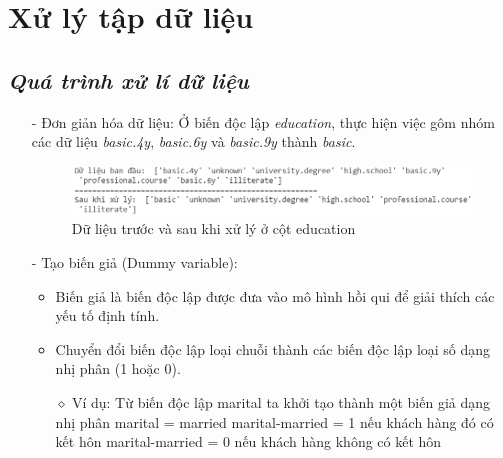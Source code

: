 \documentclass{report}
\newcommand\tab[1][1.25cm]{\hspace*{#1}}
\begin{document}
\section{Xử lý tập dữ liệu}
 \subsection{ \textit{Quá trình xử lí dữ liệu}}
        \fontsize{13}{14}\selectfont
        \begin{enumerate}
                    \item [- ] Đơn giản hóa dữ liệu: Ở biến độc lập \textit{education}, thực hiện việc gôm nhóm các dữ liệu \textit{basic.4y}, \textit{basic.6y} và \textit{basic.9y} thành \textit{basic}.
                     \begin{center}
        \begin{figure}[htp]
    	\begin{center}
    		\includegraphics[scale =0.7]{images/basic.png}
    	\end{center}
    		\caption{Dữ liệu trước và sau khi xử lý ở cột education}
    \end{figure}
        \end{center}
    \item [- ]	Tạo biến giả (Dummy variable):
                        \begin{itemize}
                            \item Biến giả là biến độc lập được đưa vào mô hình hồi qui để giải thích các yếu tố định tính.
                            \item Chuyển đổi biến độc lập loại chuỗi thành các biến độc lập loại số dạng nhị phân (1 hoặc 0).
                            \item [$\diamond$] Ví dụ: Từ biến độc lập marital ta khởi tạo thành một biến giả dạng nhị phân 
                            \newline\tab[1.25cm] marital = married
                            \newline\tab[1.25cm] marital-married = 1 nếu khách hàng đó có kết hôn
                            \newline\tab[1.25cm] marital-married = 0 nếu khách hàng không có kết hôn
                        \end{itemize}
                        

\end{enumerate}
\end{document}
